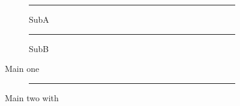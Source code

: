 \documentclass{article}
\begin{document}
\listoffigures
\begin{figure}[h]
\begin{subfigure}{.3\linewidth}\rule{1cm}{1cm}\caption{SubA}\end{subfigure}
\begin{subfigure}{.3\linewidth}\rule{1cm}{1cm}\caption{SubB}\end{subfigure}
\caption*{Source: somewhere}
\caption{Main one}
\end{figure}
\begin{figure}[h]
\begin{subfigure}{.3\linewidth}\rule{1cm}{1cm}\label{ph}\end{subfigure}
\caption{Main two with }
\end{figure}
\end{document}
